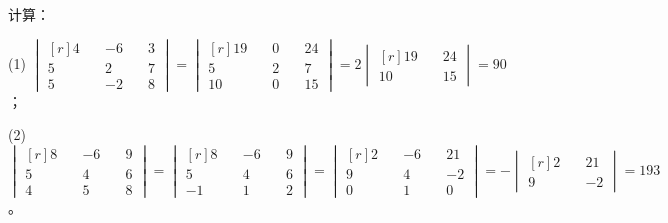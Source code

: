 \liti 计算：


\jie

(1) \quad $
\begin{vmatrix*}[r]
    4 \quad & -6 \quad & 3 \\
    5 \quad & 2 \quad & 7 \\
    5 \quad & -2 \quad & 8
\end{vmatrix*}
=   \begin{vmatrix*}[r]
        19 \quad & 0 \quad & 24 \\
        5 \quad & 2 \quad & 7 \\
        10 \quad & 0 \quad & 15
    \end{vmatrix*}
= 2 \begin{vmatrix*}[r]
        19 \quad & 24 \\
        10 \quad & 15
    \end{vmatrix*}
= 90
$；

(2) \quad $
\begin{vmatrix*}[r]
    8 \quad & -6 \quad & 9 \\
    5 \quad & 4 \quad & 6 \\
    4 \quad & 5 \quad & 8
\end{vmatrix*}
=   \begin{vmatrix*}[r]
        8 \quad & -6 \quad & 9 \\
        5 \quad & 4 \quad & 6 \\
        -1 \quad & 1 \quad & 2
    \end{vmatrix*}
=   \begin{vmatrix*}[r]
        2 \quad & -6 \quad & 21 \\
        9 \quad & 4 \quad & -2 \\
        0 \quad & 1 \quad & 0
    \end{vmatrix*}
= - \begin{vmatrix*}[r]
        2 \quad & 21 \\
        9 \quad & -2
    \end{vmatrix*}
= 193
$。


